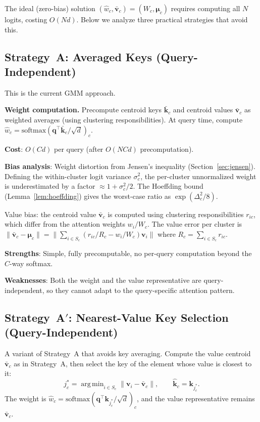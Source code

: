 \documentclass[11pt,a4paper]{article}
\theoremstyle{definition}
\newcommand{\vv}{\mathbf{v}}
\newcommand{\kk}{\mathbf{k}}
\newcommand{\qq}{\mathbf{q}}
\newcommand{\bmu}{\boldsymbol{\mu}}
\newcommand{\softmax}{\mathrm{softmax}}
\DeclareMathOperator*{\argmin}{arg\,min}
\begin{document}
The ideal (zero-bias) solution $(\hat{w}_c, \bar{\vv}_c) = (W_c, \bmu_c)$
requires computing all $N$ logits, costing $O(Nd)$.  Below we analyze three
practical strategies that avoid this.

\subsection{Strategy~A: Averaged Keys (Query-Independent)}
\label{sec:strat-avg}

This is the current GMM approach.

\textbf{Weight computation.}
Precompute centroid keys $\bar{\kk}_c$ and centroid values $\bar{\vv}_c$
as weighted averages (using clustering responsibilities).  At query time,
compute $\hat{w}_c = \softmax(\qq^{\!\top}\bar{\kk}_c/\sqrt{d})_c$.

\textbf{Cost}: $O(Cd)$ per query (after $O(NCd)$ precomputation).

\textbf{Bias analysis}: Weight distortion from Jensen's inequality
(Section~\ref{sec:jensen}).  Defining the within-cluster logit variance
$\sigma_c^2$, the per-cluster unnormalized weight is underestimated by a
factor $\approx 1 + \sigma_c^2/2$.  The Hoeffding bound
(Lemma~\ref{lem:hoeffding}) gives the worst-case ratio as
$\exp(\Delta_c^2/8)$.

Value bias: the centroid value $\bar{\vv}_c$ is computed using clustering
responsibilities $r_{ic}$, which differ from the attention weights $w_i/W_c$.
The value error per cluster is
$\|\bar{\vv}_c - \bmu_c\| = \bigl\|\sum_{i\in S_c}(r_{ic}/R_c - w_i/W_c)\vv_i\bigr\|$
where $R_c = \sum_{i\in S_c}r_{ic}$.

\textbf{Strengths}: Simple, fully precomputable, no per-query computation
beyond the $C$-way softmax.

\textbf{Weaknesses}: Both the weight and the value representative are
query-independent, so they cannot adapt to the query-specific attention
pattern.

\subsection{Strategy~A$'$: Nearest-Value Key Selection (Query-Independent)}
\label{sec:strat-nvk}

A variant of Strategy~A that avoids key averaging.
Compute the value centroid $\bar{\vv}_c$ as in Strategy~A, then select
the key of the element whose value is closest to it:
\[
  j_c^* = \argmin_{i\in S_c}\|\vv_i - \bar{\vv}_c\|,
  \qquad
  \hat{\kk}_c = \kk_{j_c^*}.
\]
The weight is $\hat{w}_c = \softmax(\qq^{\!\top}\kk_{j_c^*}/\sqrt{d})_c$,
and the value representative remains $\bar{\vv}_c$.
\end{document}
